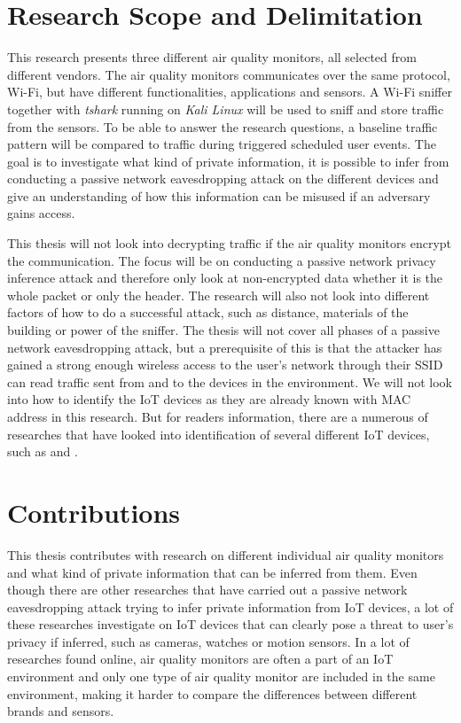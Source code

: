 \section{Research Scope and Delimitation}
This research presents three different air quality monitors, all selected from different vendors. The air quality monitors communicates over the same protocol, \gls{Wi-Fi}, but have different functionalities, applications and sensors. A \gls{Wi-Fi} sniffer together with \textit{tshark} running on \textit{Kali Linux} will be used to sniff and store traffic from the sensors. To be able to answer the research questions, a baseline traffic pattern will be compared to traffic during triggered scheduled user events. The goal is to investigate what kind of private information, it is possible to infer from conducting a passive network eavesdropping attack on the different devices and give an understanding of how this information can be misused if an adversary gains access. 

This thesis will not look into decrypting traffic if the air quality monitors encrypt the communication. The focus will be on conducting a passive network privacy inference attack and therefore only look at non-encrypted data whether it is the whole packet or only the header. The research will also not look into different factors of how to do a successful attack, such as distance, materials of the building or power of the sniffer. The thesis will not cover all phases of a passive network eavesdropping attack, but a prerequisite of this is that the attacker has gained a strong enough wireless access to the user's network through their \gls{SSID} can read traffic sent from and to the devices in the environment. We will not look into how to identify the \gls{IoT} devices as they are already known with \gls{MAC} address in this research. But for readers information, there are a numerous of researches that have looked into identification of several different \gls{IoT} devices, such as \cite{IdentifyIoT1} and \cite{IdentifyingIoT2}. 

\section{Contributions}
This thesis contributes with research on different individual air quality monitors and what kind of private information that can be inferred from them. Even though there are other researches that have carried out a passive network eavesdropping attack trying to infer private information from \gls{IoT} devices, a lot of these researches investigate on \gls{IoT} devices that can clearly pose a threat to user's privacy if inferred, such as cameras, watches or motion sensors. In a lot of researches found online, air quality monitors are often a part of an \gls{IoT} environment and only one type of air quality monitor are included in the same environment, making it harder to compare the differences between different brands and sensors. 

